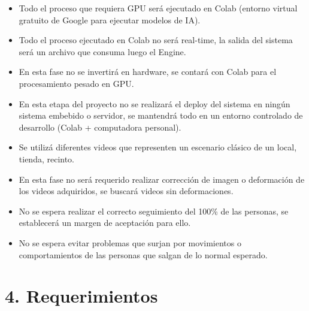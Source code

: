 \documentclass[11pt]{charter}
\begin{document}
\begin{itemize}
\item Todo el proceso que requiera GPU será ejecutado en Colab (entorno virtual gratuito de Google para ejecutar modelos de IA).
\item Todo el proceso ejecutado en Colab no será real-time, la salida del sistema será un archivo que consuma luego el Engine.
\item En esta fase no se invertirá en hardware, se contará con Colab para el procesamiento pesado en GPU.
\item En esta etapa del proyecto no se realizará el deploy del sistema en ningún sistema embebido o servidor, se mantendrá todo en un entorno controlado de desarrollo (Colab + computadora personal).
\item Se utilizá diferentes videos que representen un escenario clásico de un local, tienda, recinto.
\item En esta fase no será requerido realizar corrección de imagen o deformación de los videos adquiridos, se buscará videos sin deformaciones.
\item No se espera realizar el correcto seguimiento del 100\% de las personas, se establecerá un margen de aceptación para ello.
\item No se espera evitar problemas que surjan por movimientos o comportamientos de las personas que salgan de lo normal esperado.
\end{itemize}

\newpage

\section{4. Requerimientos}
\label{sec:requerimientos}
\end{document}
